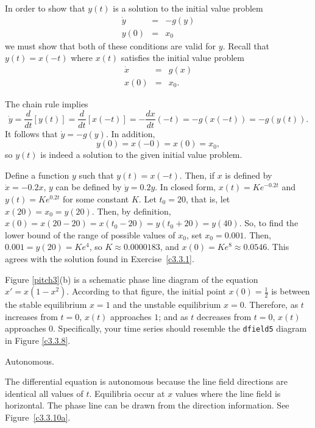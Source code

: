 In order to show that $y(t)$ is a solution to the initial value problem
\[
\begin{array}{rcl}
\dot{y} & = & -g(y) \\
y(0) & = & x_0\end{array}
\]
we must show that both of these conditions are valid for $y$.  Recall that
$y(t) = x(-t)$ where $x(t)$ satisfies the initial value problem
\[ \begin{array}{rcl}
\dot{x} & = & g(x) \\
x(0) & = & x_0.\end{array} \]

The chain rule implies
\[ \dot{y} = \frac{d}{dt}[y(t)] = \frac{d}{dt}[x(-t)] =
-\frac{dx}{dt}(-t) = -g(x(-t)) = -g(y(t)). \]
It follows that $\dot y = -g(y)$.
In addition,
\[ y(0) = x(-0) = x(0) = x_0, \]
so $y(t)$ is indeed a solution to the given initial value problem.

Define a function $y$ such that $y(t) = x(-t)$.  Then, if $x$ is defined by
$\dot{x} = -0.2x$, $y$ can be defined by $\dot{y} = 0.2y$.  In closed form,
$x(t) = Ke^{-0.2t}$ and $y(t) = Ke^{0.2t}$ for some constant $K$.  Let $t_0
= 20$, that is, let $x(20) = x_0 = y(20)$.  Then, by definition,
$x(0) = x(20 - 20) = x(t_0 - 20) = y(t_0 + 20) = y(40)$.  So, to find the
lower bound of the range of possible values of $x_0$, set $x_0 = 0.001$.
Then, $0.001 = y(20) = Ke^4$, so $K \approx 0.0000183$, and $x(0) = Ke^8
\approx 0.0546$.  This agrees with the solution found in
Exercise~\ref{c3.3.1}.

\newpage
{}
Figure \ref{pitch3}(b) is a schematic
phase line diagram of the equation $x' = x(1 - x^2)$.  According
to that figure, the initial point $x(0) = \frac{1}{2}$ is between
the stable equilibrium $x = 1$ and the unstable equilibrium
$x = 0$.  Therefore, as $t$ increases from $t = 0$, $x(t)$
approaches $1$; and as $t$ decreases from $t = 0$, $x(t)$
approaches $0$.  Specifically, your time series should resemble
the {\tt dfield5} diagram in Figure \ref{c3.3.8}.

\begin{figure}[htb]
                       \centerline{%
                       }
\end{figure}

 \ans Autonomous.

\soln  The differential equation is autonomous because the line field 
directions are identical all values of $t$.  Equilibria occur at $x$ values 
where the line field is horizontal.  The phase line can be drawn from the 
direction information.  See Figure~\ref{c3.3.10a}.

